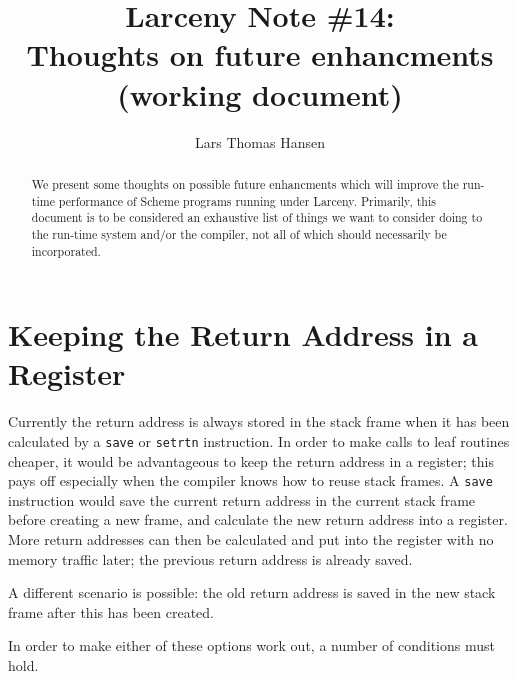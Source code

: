 
\title{Larceny Note \#14: \\
       Thoughts on future enhancments \\
       {\tenrm (working document)}}
\author{Lars Thomas Hansen}


\maketitle

\begin{abstract}
We present some thoughts on possible future enhancments which will improve the
run-time performance of Scheme programs running under Larceny. Primarily,
this document is to be considered an exhaustive list of things we want to
consider doing to the run-time system and/or the compiler, not all of which
should necessarily be incorporated.
\end{abstract}

\section{Keeping the Return Address in a Register}

Currently the return address is always stored in the stack frame when it has
been calculated by a {\tt save} or {\tt setrtn} instruction. In order to make
calls to leaf routines cheaper, it would be advantageous to keep the return
address in a register; this pays off especially when the compiler knows how
to reuse stack frames. A {\tt save} instruction would save the current return
address in the current stack frame before creating a new frame, and calculate
the new return address into a register. More return addresses can then be
calculated and put into the register with no memory traffic later; the previous
return address is already saved.

A different scenario is possible: the old return address is saved in the new
stack frame after this has been created.

In order to make either of these options work out, a number of conditions
must hold.

